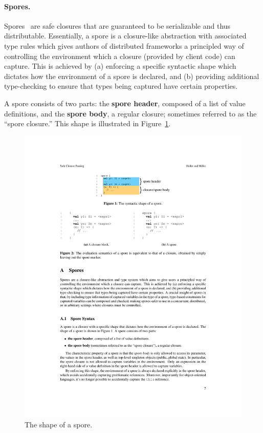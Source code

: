 \documentclass{jfp1}
\begin{document}
\paragraph{Spores.}

Spores~\cite{Spores} are safe closures that are guaranteed to be serializable
and thus distributable. Essentially, a spore is a closure-like abstraction with associated type rules
which gives authors of distributed frameworks a principled way of controlling
the environment which a closure (provided by client code) can capture. This is
achieved by (a) enforcing a specific syntactic shape which dictates how the
environment of a spore is declared, and (b) providing additional type-checking
to ensure that types being captured have certain properties.

\vspace{3mm}
\noindent A spore consists of two parts: the \textbf{spore header}, composed of
a list of value definitions, and the \textbf{spore body}, a regular closure;
sometimes referred to as the ``spore closure.'' This shape is illustrated in
Figure~\ref{fig:spore-shape}.

\begin{figure}[ht!]
\centering\includegraphics[width=0.75\columnwidth]{pic/spore-shape.pdf}
\caption{The shape of a spore.}\label{fig:spore-shape}
\end{figure}
\end{document}

